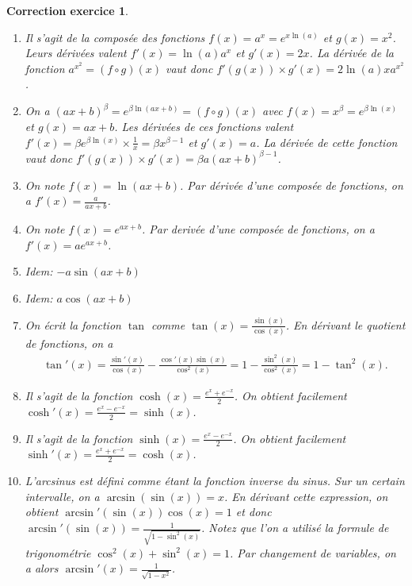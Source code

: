 \documentclass[12pt]{article}
\newtheorem{correction}{\bf Correction exercice}
\newenvironment{cor}{
\begin{correction}\smallskip\normalfont}{\end{correction}
}
\newif\ifcorrige\corrigetrue
\begin{document}
\ifcorrige
\color{magenta}
\begin{cor}
$\qquad$
\begin{enumerate}
\item Il s'agit de la compos\'ee des fonctions $f(x) = a^x = e^{x \ln(a)}$ et $g(x) = x^2$.
  Leurs d\'eriv\'ees valent $f'(x) = \ln(a) a^x$ et $g'(x) = 2x$.
  La d\'eriv\'ee de la fonction $a^{x^2} = (f \circ g)(x)$ vaut donc
  $f'(g(x)) \times g'(x) = 2 \ln(a) x a^{x^2}$.

\item On a $(ax+b)^{\beta} = e^{\beta \ln(ax+b) } = (f \circ g)(x)$
  avec $f(x) = x^{\beta} = e^{\beta \ln(x)}$ et $g(x) = ax+b$.
  Les d\'eriv\'ees de ces fonctions valent
  $f'(x) = \beta e^{\beta \ln(x)} \times \frac1x = \beta x^{\beta - 1}$
  et $g'(x) = a$.
  La d\'eriv\'ee de cette fonction vaut donc
  $f'(g(x)) \times g'(x) = \beta a (ax+b)^{\beta - 1}$.

\item On note $f(x) = \ln(ax+b)$.
  Par d\'eriv\'ee d'une compos\'ee de fonctions, on a $f'(x) = \frac{a}{ax+b}$.

\item On note $f(x) = e^{ax+b}$. Par deriv\'ee d'une compos\'ee de fonctions, on a
  $f'(x) = a e^{ax+b}$.

\item Idem:
  $- a \sin(ax+b)$

\item Idem: $a \cos(ax+b)$

\item On \'ecrit la fonction $\tan$ comme $\tan(x) = \frac{\sin(x)}{\cos(x)}$.
  En d\'erivant le quotient de fonctions, on a
  \begin{align*}
    \tan'(x) = \frac{\sin'(x)}{\cos(x)} - \frac{\cos'(x)\sin(x)}{\cos^2(x)}
    = 1 - \frac{\sin^2(x)}{\cos^2(x)} = 1 - \tan^2(x) .
  \end{align*}

\item Il s'agit de la fonction $\cosh(x) = \frac{e^x + e^{-x}}{2}$.
  On obtient facilement $\cosh'(x) = \frac{e^x - e^{-x}}{2} = \sinh(x)$.

\item Il s'agit de la fonction $\sinh(x) = \frac{e^x - e^{-x}}{2}$.
  On obtient facilement $\sinh'(x) = \frac{e^x + e^{-x}}{2} = \cosh(x)$.

\item L'arcsinus est d\'efini comme \'etant la fonction inverse du sinus.
  Sur un certain intervalle, on a $\arcsin(\sin(x)) = x$.
  En d\'erivant cette expression, on obtient
  $\arcsin'(\sin(x)) \cos(x) = 1$
  et donc
  $\arcsin'(\sin(x)) = \frac{1}{\sqrt{1-\sin^2(x)}}$.
  Notez que l'on a utilis\'e la formule de trigonom\'etrie $\cos^2(x) + \sin^2(x) = 1$.
  Par changement de variables, on a alors
  $\arcsin'(x) = \frac{1}{\sqrt{1-x^2}}$.


\end{enumerate}
\end{cor}
\end{document}
